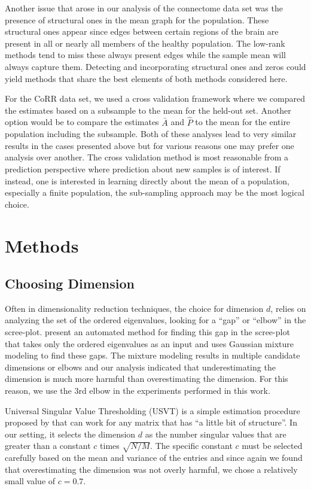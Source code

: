 \documentclass[a4paper]{article}
\begin{document}
Another issue that arose in our analysis of the connectome data set was the presence of structural ones in the mean graph for the population. 
These structural ones appear since edges between certain regions of the brain are present in all or nearly all members of the healthy population. 
The low-rank methods tend to miss these always present edges while the sample mean will always capture them.
Detecting and incorporating structural ones and zeros could yield methods that share the best elements of both methods considered here.

For the CoRR data set, we used a cross validation framework where we compared the estimates based on a subsample to the mean for the held-out set. 
Another option would be to compare the estimates $\bar{A}$ and $\hat{P}$ to the mean for the entire population including the subsample.
Both of these analyses lead to very similar results in the cases presented above but for various reasons one may prefer one analysis over another.
The cross validation method is most reasonable from a prediction perspective where prediction about new samples is of interest.
If instead, one is interested in learning directly about the mean of a population, especially a finite population, the sub-sampling approach may be the most logical choice.

\section{Methods}

\subsection{Choosing Dimension}
\label{section:dim_select}
Often in dimensionality reduction techniques, the choice for dimension $d$, relies on analyzing the set of the ordered eigenvalues, looking for a ``gap'' or ``elbow'' in the scree-plot. \citet{zhu2006automatic} present an automated method for finding this gap in the scree-plot that takes only the ordered eigenvalues as an input and uses Gaussian mixture modeling to find these gaps.
The mixture modeling results in multiple candidate dimensions or elbows and our analysis indicated that underestimating the dimension is much more harmful than overestimating the dimension.
For this reason, we use the 3rd elbow in the experiments performed in this work.

Universal Singular Value Thresholding (USVT) is a simple estimation procedure proposed by \citet{chatterjee2015matrix} that can work for any matrix that has ``a little bit of structure''. 
In our setting, it selects the dimension $d$ as the number singular values that are greater than a constant $c$ times $\sqrt{N/M}$.
The specific constant $c$ must be selected carefully based on the mean and variance of the entries and since again we found that overestimating the dimension was not overly harmful, we chose a relatively small value of $c=0.7$.
\end{document}
